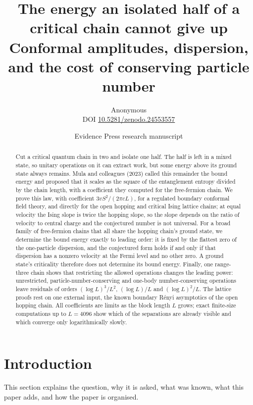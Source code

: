 \documentclass[11pt,a4paper]{article}
\title{\bfseries\color{ink} The energy an isolated half of a critical chain cannot give up\\[3pt]\large Conformal amplitudes, dispersion, and the cost of conserving particle number}
\author{Anonymous\\[3pt]{\small DOI \href{https://doi.org/10.5281/zenodo.24553557}{10.5281/zenodo.24553557}}}
\date{Evidence Press research manuscript}
\theoremstyle{remark}
\begin{document}
\maketitle
\begin{abstract}
Cut a critical quantum chain in two and isolate one half. The half is left in a mixed state, so unitary operations on it can extract work, but some energy above its ground state always remains. Mula and colleagues (2023) called this remainder the bound energy and proposed that it scales as the square of the entanglement entropy divided by the chain length, with a coefficient they computed for the free-fermion chain. We prove this law, with coefficient $3vS^2/(2\pi cL)$, for a regulated boundary conformal field theory, and directly for the open hopping and critical Ising lattice chains; at equal velocity the Ising slope is twice the hopping slope, so the slope depends on the ratio of velocity to central charge and the conjectured number is not universal. For a broad family of free-fermion chains that all share the hopping chain's ground state, we determine the bound energy exactly to leading order: it is fixed by the flattest zero of the one-particle dispersion, and the conjectured form holds if and only if that dispersion has a nonzero velocity at the Fermi level and no other zero. A ground state's criticality therefore does not determine its bound energy. Finally, one range-three chain shows that restricting the allowed operations changes the leading power: unrestricted, particle-number-conserving and one-body number-conserving operations leave residuals of orders $(\log L)^3/L^2$, $(\log L)/L$ and $(\log L)^2/L$. The lattice proofs rest on one external input, the known boundary R\'enyi asymptotics of the open hopping chain. All coefficients are limits as the block length $L$ grows; exact finite-size computations up to $L=4096$ show which of the separations are already visible and which converge only logarithmically slowly.
\end{abstract}

\section{Introduction}\label{sec:intro}
This section explains the question, why it is asked, what was known, what this paper adds, and how the paper is organised.
\end{document}
